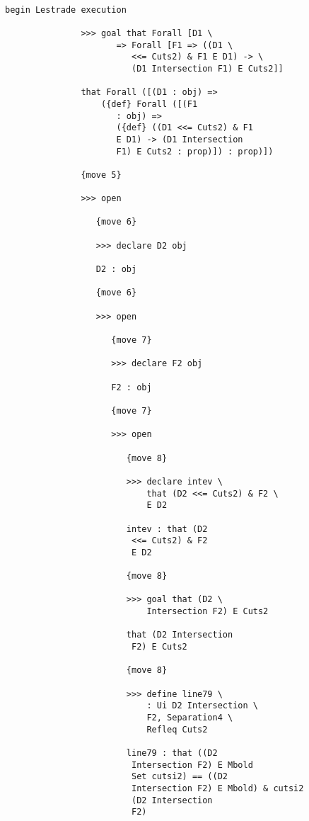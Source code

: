 \documentclass[12pt]{article}
\begin{document}
\begin{verbatim}

begin Lestrade execution

               >>> goal that Forall [D1 \
                      => Forall [F1 => ((D1 \
                         <<= Cuts2) & F1 E D1) -> \
                         (D1 Intersection F1) E Cuts2]]

               that Forall ([(D1 : obj) => 
                   ({def} Forall ([(F1 
                      : obj) => 
                      ({def} ((D1 <<= Cuts2) & F1 
                      E D1) -> (D1 Intersection 
                      F1) E Cuts2 : prop)]) : prop)])

               {move 5}

               >>> open

                  {move 6}

                  >>> declare D2 obj

                  D2 : obj

                  {move 6}

                  >>> open

                     {move 7}

                     >>> declare F2 obj

                     F2 : obj

                     {move 7}

                     >>> open

                        {move 8}

                        >>> declare intev \
                            that (D2 <<= Cuts2) & F2 \
                            E D2

                        intev : that (D2 
                         <<= Cuts2) & F2 
                         E D2

                        {move 8}

                        >>> goal that (D2 \
                            Intersection F2) E Cuts2

                        that (D2 Intersection 
                         F2) E Cuts2

                        {move 8}

                        >>> define line79 \
                            : Ui D2 Intersection \
                            F2, Separation4 \
                            Refleq Cuts2

                        line79 : that ((D2 
                         Intersection F2) E Mbold 
                         Set cutsi2) == ((D2 
                         Intersection F2) E Mbold) & cutsi2 
                         (D2 Intersection 
                         F2)


\end{verbatim}
\end{document}
